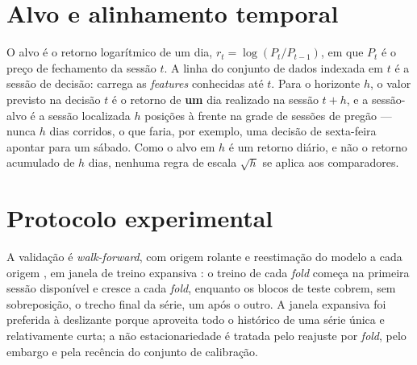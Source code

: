 \section{Alvo e alinhamento temporal} \label{sec:alvo}
O alvo é o retorno logarítmico de um dia, \(r_t = \log(P_t / P_{t-1})\), em que \(P_t\) é o preço de fechamento da sessão \(t\). A linha do conjunto de dados indexada em \(t\) é a sessão de decisão: carrega as \textit{features} conhecidas até \(t\). Para o horizonte \(h\), o valor previsto na decisão \(t\) é o retorno de \textbf{um} dia realizado na sessão \(t+h\), e a sessão-alvo é a sessão localizada \(h\) posições à frente na grade de sessões de pregão --- nunca \(h\) dias corridos, o que faria, por exemplo, uma decisão de sexta-feira apontar para um sábado. Como o alvo em \(h\) é um retorno diário, e não o retorno acumulado de \(h\) dias, nenhuma regra de escala \(\sqrt{h}\) se aplica aos comparadores.

\section{Protocolo experimental}
A validação é \textit{walk-forward}, com origem rolante e reestimação do modelo a cada origem \cite{TASHMAN2000}, em janela de treino expansiva \cite{HYNDMANATHANASOPOULOS2021}: o treino de cada \textit{fold} começa na primeira sessão disponível e cresce a cada \textit{fold}, enquanto os blocos de teste cobrem, sem sobreposição, o trecho final da série, um após o outro. A janela expansiva foi preferida à deslizante porque aproveita todo o histórico de uma série única e relativamente curta; a não estacionariedade é tratada pelo reajuste por \textit{fold}, pelo embargo e pela recência do conjunto de calibração.


